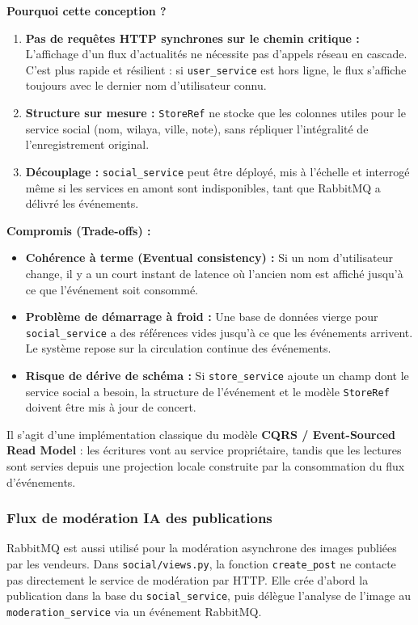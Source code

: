 \documentclass[11pt,a4paper]{article}
\begin{document}
\textbf{Pourquoi cette conception ?}
\begin{enumerate}
  \item \textbf{Pas de requêtes HTTP synchrones sur le chemin critique :} L'affichage d'un flux d'actualités ne nécessite pas d'appels réseau en cascade. C'est plus rapide et résilient : si \texttt{user\_service} est hors ligne, le flux s'affiche toujours avec le dernier nom d'utilisateur connu.
  \item \textbf{Structure sur mesure :} \texttt{StoreRef} ne stocke que les colonnes utiles pour le service social (nom, wilaya, ville, note), sans répliquer l'intégralité de l'enregistrement original.
  \item \textbf{Découplage :} \texttt{social\_service} peut être déployé, mis à l'échelle et interrogé même si les services en amont sont indisponibles, tant que RabbitMQ a délivré les événements.
\end{enumerate}

\textbf{Compromis (Trade-offs) :}
\begin{itemize}
  \item \textbf{Cohérence à terme (Eventual consistency) :} Si un nom d'utilisateur change, il y a un court instant de latence où l'ancien nom est affiché jusqu'à ce que l'événement soit consommé.
  \item \textbf{Problème de démarrage à froid :} Une base de données vierge pour \texttt{social\_service} a des références vides jusqu'à ce que les événements arrivent. Le système repose sur la circulation continue des événements.
  \item \textbf{Risque de dérive de schéma :} Si \texttt{store\_service} ajoute un champ dont le service social a besoin, la structure de l'événement et le modèle \texttt{StoreRef} doivent être mis à jour de concert.
\end{itemize}

Il s'agit d'une implémentation classique du modèle \textbf{CQRS / Event-Sourced Read Model} : les écritures vont au service propriétaire, tandis que les lectures sont servies depuis une projection locale construite par la consommation du flux d'événements.

\subsubsection*{Flux de modération IA des publications}

RabbitMQ est aussi utilisé pour la modération asynchrone des images publiées par les vendeurs. Dans \texttt{social/views.py}, la fonction \texttt{create\_post} ne contacte pas directement le service de modération par HTTP. Elle crée d'abord la publication dans la base du \texttt{social\_service}, puis délègue l'analyse de l'image au \texttt{moderation\_service} via un événement RabbitMQ.
\end{document}
